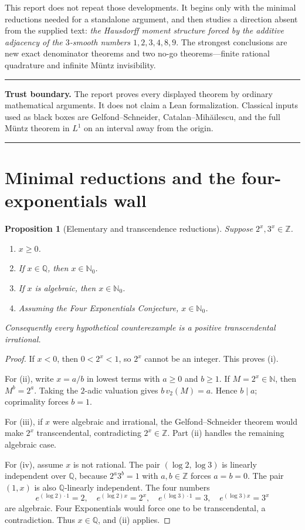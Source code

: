 \documentclass[11pt,oneside]{article}
\newtheorem{proposition}[theorem]{Proposition}
\theoremstyle{definition}
\theoremstyle{remark}
\newcommand{\N}{\mathbb N}
\newcommand{\Nzero}{\mathbb N_0}
\newcommand{\Z}{\mathbb Z}
\newcommand{\Q}{\mathbb Q}
\newenvironment{statusbox}
{\begin{center}\begin{minipage}{0.92\textwidth}\small\hrule\vspace{0.45em}}
{\vspace{0.35em}\hrule\end{minipage}\end{center}}
\begin{document}
This report does not repeat those developments.  It begins only with the minimal reductions
needed for a standalone argument, and then studies a direction absent from the supplied text:
\emph{the Hausdorff moment structure forced by the additive adjacency of the $3$-smooth
numbers $1,2,3,4,8,9$}.  The strongest conclusions are new exact denominator theorems and two
no-go theorems---finite rational quadrature and infinite M\"untz invisibility.

\begin{statusbox}
\textbf{Trust boundary.}  The report proves every displayed theorem by ordinary mathematical
arguments.  It does not claim a Lean formalization.  Classical inputs used as black boxes are
Gelfond--Schneider, Catalan--Mih\u{a}ilescu, and the full M\"untz theorem in $L^1$ on an interval
away from the origin.
\end{statusbox}

\section{Minimal reductions and the four-exponentials wall}

\begin{proposition}[Elementary and transcendence reductions]\label{prop:minimal-reductions}
Suppose $2^x,3^x\in\Z$.
\begin{enumerate}[label=\textup{(\roman*)}]
\item $x\ge0$.
\item If $x\in\Q$, then $x\in\Nzero$.
\item If $x$ is algebraic, then $x\in\Nzero$.
\item Assuming the Four Exponentials Conjecture, $x\in\Nzero$.
\end{enumerate}
Consequently every hypothetical counterexample is a positive transcendental irrational.
\end{proposition}

\begin{proof}
If $x<0$, then $0<2^x<1$, so $2^x$ cannot be an integer.  This proves (i).

For (ii), write $x=a/b$ in lowest terms with $a\ge0$ and $b\ge1$.  If $M=2^x\in\N$, then
$M^b=2^a$.  Taking the $2$-adic valuation gives $b\,v_2(M)=a$.  Hence $b\mid a$; coprimality
forces $b=1$.

For (iii), if $x$ were algebraic and irrational, the Gelfond--Schneider theorem would make
$2^x$ transcendental, contradicting $2^x\in\Z$.  Part (ii) handles the remaining algebraic
case.

For (iv), assume $x$ is not rational.  The pair $(\log2,\log3)$ is linearly independent over
$\Q$, because $2^a3^b=1$ with $a,b\in\Z$ forces $a=b=0$.  The pair $(1,x)$ is also
$\Q$-linearly independent.  The four numbers
\[
 e^{(\log2)\cdot1}=2,\quad e^{(\log2)x}=2^x,\quad
 e^{(\log3)\cdot1}=3,\quad e^{(\log3)x}=3^x
\]
are algebraic.  Four Exponentials would force one to be transcendental, a contradiction.
Thus $x\in\Q$, and (ii) applies.
\end{proof}
\end{document}
